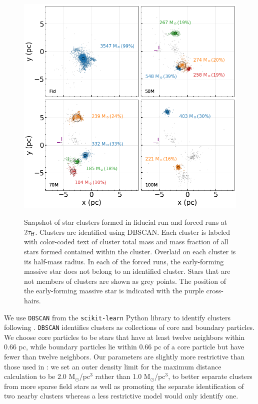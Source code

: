 \documentclass[twoside]{drexel-thesis}
\begin{document}
\begin{thesis}
\begin{figure}[!htb]
	\includegraphics[width=0.8\linewidth]{cluster_panel_EFMS_ind.png}\\
	\centering
    \caption{Snapshot of star clusters formed in fiducial run and forced runs at $2\tau_{\rm ff}$. Clusters are identified using DBSCAN. Each cluster is labeled with color-coded text of cluster total mass and mass fraction of all stars formed contained within the cluster. Overlaid on each cluster is its half-mass radius. In each of the forced runs, the early-forming massive star does not belong to an identified cluster. Stars that are not members of clusters are shown as grey points. The position of the early-forming massive star is indicated with the purple cross-hairs.}
    \label{fig:clust_grid_plot}
\end{figure}

We use \texttt{DBSCAN} from the {\tt scikit-learn} Python library \citep{pedregosa_f_scikit-learn_2011} to identify clusters following \citet{wall_modeling_2020}. \texttt{DBSCAN} identifies clusters as collections of core and boundary particles. We choose core particles to be stars that have at least twelve neighbors within 0.66 pc, while boundary particles lie within 0.66 pc of a core particle but have fewer than twelve neighbors. Our parameters are slightly more restrictive than those used in \citet{wall_modeling_2020}: we set an outer density limit for the maximum distance calculation to be 2.0 M$_\odot$/pc$^3$ rather than 1.0 M$_\odot$/pc$^3$, to better separate clusters from more sparse field stars as well as promoting the separate identification of two nearby clusters whereas a less restrictive model would only identify one.


\end{thesis}
\end{document}
